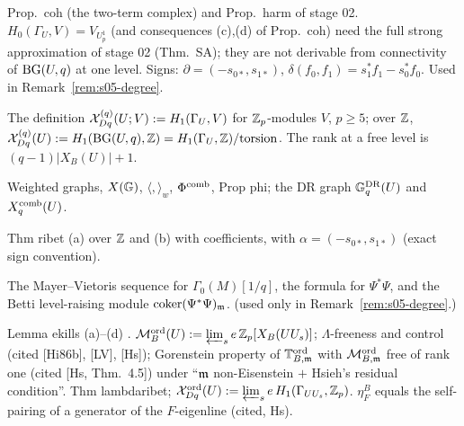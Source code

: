 \begin{interface}
Prop.~coh (the two-term complex) and Prop.~harm of stage 02. $H_0(\Gamma_U,V)=V_{U_p^1}$ (and consequences (c),(d) of Prop.~coh)
need the full strong approximation of stage 02 (Thm.~SA); they are not derivable from connectivity of $\mathrm{BG}(U,q)$ at one level.
Signs: $\partial=(-s_{0*},s_{1*})$, $\delta(f_0,f_1)=s_1^*f_1-s_0^*f_0$.  Used in
Remark~\ref{rem:s05-degree}.
\end{interface}
\begin{interface}
The definition $\mathcal{X}^{(q)}_{Dq}(U;V):=H_1(\Gamma_U,V)$ for $\mathbb{Z}_p$-modules $V$, $p\ge5$; over $\mathbb{Z}$,
$\mathcal{X}^{(q)}_{Dq}(U):=H_1(\mathrm{BG}(U,q),\mathbb{Z})=H_1(\Gamma_U,\mathbb{Z})/\mathrm{torsion}$. The rank at a free level is $(q-1)|X_B(U)|+1$.
\end{interface}
\begin{interface}
Weighted graphs, $X(\mathbb{G})$, $\langle,\rangle_w$, $\Phi^{\rm comb}$, Prop phi; the DR graph $\mathbb{G}^{\rm DR}_q(U)$ and $X^{\rm comb}_q(U)$.
\end{interface}
\begin{interface}
Thm ribet (a) over $\mathbb{Z}$ and (b) with coefficients, with $\alpha=(-s_{0*},s_{1*})$ (exact sign convention).
\end{interface}
\begin{interface}
The Mayer--Vietoris sequence for $\Gamma_0(M)[1/q]$, the formula for $\Psi^*\Psi$, and the Betti level-raising module
$\operatorname{coker}(\Psi^*\Psi)_{\mathfrak{m}}$.  (used only in Remark~\ref{rem:s05-degree}.)
\end{interface}
\begin{interface}
Lemma ekills (a)--(d) .
$\mathcal{M}^{\rm ord}_B(U):=\varprojlim_se\,\mathbb{Z}_p[X_B(UU_s)]$; $\Lambda$-freeness and control (cited [Hi86b], [LV],
[Hs]); Gorenstein property of $\mathbb{T}^{\rm ord}_{B,\mathfrak{m}}$ with $\mathcal{M}^{\rm ord}_{B,\mathfrak{m}}$ free of rank one (cited [Hs, Thm.~4.5]) under ``$\mathfrak{m}$
non-Eisenstein $+$ Hsieh's residual condition''. Thm lambdaribet; $\mathcal{X}^{\rm ord}_{Dq}(U):=\varprojlim_se\,H_1(\Gamma_{UU_s},\mathbb{Z}_p)$.
$\eta^B_F$ equals the self-pairing of a generator of the $F$-eigenline (cited, Hs). 
\end{interface}

